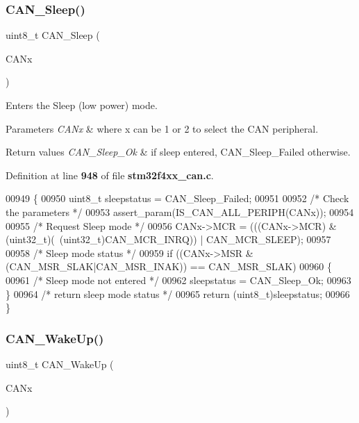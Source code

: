 \subsubsection{C\+A\+N\+\_\+\+Sleep()}
{\footnotesize\ttfamily uint8\+\_\+t C\+A\+N\+\_\+\+Sleep (\begin{DoxyParamCaption}\item[{\textbf{ C\+A\+N\+\_\+\+Type\+Def} $\ast$}]{C\+A\+Nx }\end{DoxyParamCaption})}



Enters the Sleep (low power) mode. 


\begin{DoxyParams}{Parameters}
{\em C\+A\+Nx} & where x can be 1 or 2 to select the C\+AN peripheral. \\
\hline
\end{DoxyParams}

\begin{DoxyRetVals}{Return values}
{\em C\+A\+N\+\_\+\+Sleep\+\_\+\+Ok} & if sleep entered, C\+A\+N\+\_\+\+Sleep\+\_\+\+Failed otherwise. \\
\hline
\end{DoxyRetVals}


Definition at line \textbf{ 948} of file \textbf{ stm32f4xx\+\_\+can.\+c}.


\begin{DoxyCode}
00949 \{
00950   uint8\_t sleepstatus = CAN_Sleep_Failed;
00951   
00952   \textcolor{comment}{/* Check the parameters */}
00953   assert_param(IS_CAN_ALL_PERIPH(CANx));
00954     
00955   \textcolor{comment}{/* Request Sleep mode */}
00956    CANx->MCR = (((CANx->MCR) & (uint32\_t)(~(uint32\_t)CAN_MCR_INRQ)) | 
      CAN_MCR_SLEEP);
00957    
00958   \textcolor{comment}{/* Sleep mode status */}
00959   \textcolor{keywordflow}{if} ((CANx->MSR & (CAN_MSR_SLAK|CAN_MSR_INAK)) == CAN_MSR_SLAK)
00960   \{
00961     \textcolor{comment}{/* Sleep mode not entered */}
00962     sleepstatus =  CAN_Sleep_Ok;
00963   \}
00964   \textcolor{comment}{/* return sleep mode status */}
00965    \textcolor{keywordflow}{return} (uint8\_t)sleepstatus;
00966 \}
\end{DoxyCode}
\mbox{\label{group__CAN__Group4_ga78cdfbf1884b9e33c552bcbca15bed10}} 
\subsubsection{C\+A\+N\+\_\+\+Wake\+Up()}
{\footnotesize\ttfamily uint8\+\_\+t C\+A\+N\+\_\+\+Wake\+Up (\begin{DoxyParamCaption}\item[{\textbf{ C\+A\+N\+\_\+\+Type\+Def} $\ast$}]{C\+A\+Nx }\end{DoxyParamCaption})}



